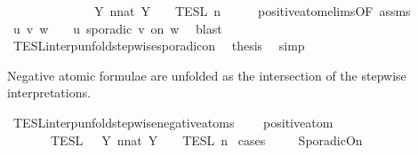 \begin{isabellebody}
\ \ \ \ \ \ \ \ \ \ \ \ {\isacharequal}\ {\isasymUnion}\ {\isacharbraceleft}Y{\isachardot}\ {\isasymexists}n{\isacharcolon}{\isacharcolon}nat{\isachardot}\ Y\ {\isacharequal}\ {\isasymlbrakk}\ {\isasymphi}\ {\isasymrbrakk}\isactrlsub T\isactrlsub E\isactrlsub S\isactrlsub L\isactrlbsup {\isasymge}\ n\isactrlesup {\isacharbraceright}{\isacartoucheclose}\isanewline
%
\isadelimproof
%
\endisadelimproof
%
\isatagproof
{}\isamarkupfalse%
\ {\isacharminus}\isanewline
\ \ \isamarkupfalse%
\ positive{\isacharunderscore}atom{\isachardot}elims{\isacharparenleft}{}{\isacharparenright}{\isacharbrackleft}OF\ assms{\isacharbrackright}\isanewline
\ \ \ \ \isamarkupfalse%
\ u\ v\ w\ \ {\isacartoucheopen}{\isasymphi}\ {\isacharequal}\ {\isacharparenleft}u\ sporadic\ v\ on\ w{\isacharparenright}{\isacartoucheclose}\ \isamarkupfalse%
\ blast\isanewline
\ \ \isamarkupfalse%
\ TESL{\isacharunderscore}interp{\isacharunderscore}unfold{\isacharunderscore}stepwise{\isacharunderscore}sporadicon\ \isamarkupfalse%
\ {\isacharquery}thesis\ \isamarkupfalse%
\ simp\isanewline
{}\isamarkupfalse%
%
\endisatagproof
{\isafoldproof}%
%
\isadelimproof
%
\endisadelimproof
%
\begin{isamarkuptext}%
Negative atomic formulae are unfolded
  as the intersection of the stepwise interpretations.%
\end{isamarkuptext}\isamarkuptrue%
\isamarkupfalse%
\ TESL{\isacharunderscore}interp{\isacharunderscore}unfold{\isacharunderscore}stepwise{\isacharunderscore}negative{\isacharunderscore}atoms{\isacharcolon}\isanewline
\ \ \ {\isacartoucheopen}{\isasymnot}\ positive{\isacharunderscore}atom\ {\isasymphi}{\isacartoucheclose}\isanewline
\ \ \ \ \ {\isacartoucheopen}{\isasymlbrakk}\ {\isasymphi}\ {\isasymrbrakk}\isactrlsub T\isactrlsub E\isactrlsub S\isactrlsub L\ {\isacharequal}\ {\isasymInter}\ {\isacharbraceleft}Y{\isachardot}\ {\isasymexists}n{\isacharcolon}{\isacharcolon}nat{\isachardot}\ Y\ {\isacharequal}\ {\isasymlbrakk}\ {\isasymphi}\ {\isasymrbrakk}\isactrlsub T\isactrlsub E\isactrlsub S\isactrlsub L\isactrlbsup {\isasymge}\ n\isactrlesup {\isacharbraceright}{\isacartoucheclose}\isanewline
%
\isadelimproof
%
\endisadelimproof
%
\isatagproof
{}\isamarkupfalse%
\ {\isacharparenleft}cases\ {\isasymphi}{\isacharparenright}\isanewline
\ \ \isamarkupfalse%
\ SporadicOn\ \isamarkupfalse%

\end{isabellebody}
